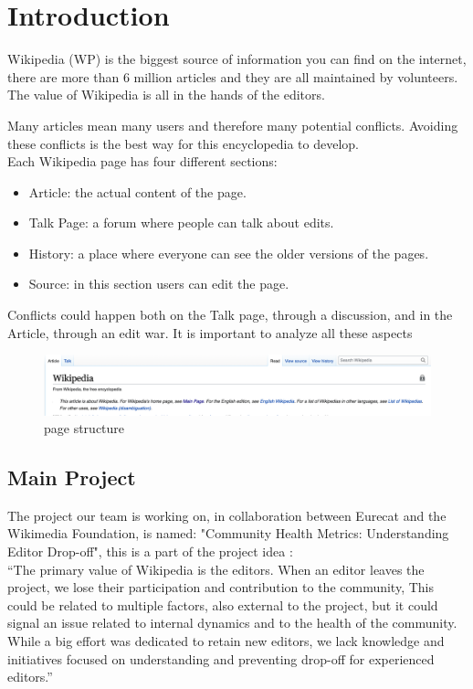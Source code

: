 \chapter{Introduction}
Wikipedia (WP) is the biggest source of information you can find on the internet, there are more
than 6 million articles and they are all maintained by volunteers. The value of Wikipedia is all in
the hands of the editors.

Many articles mean many users and therefore many potential conflicts. Avoiding these conflicts is
the best way for this encyclopedia to develop. \\ 
Each Wikipedia page has four different sections:  
\begin{itemize}
    \item Article: the actual content of the page.
    \item Talk Page: a forum where people can talk about edits. 
    \item History: a place where everyone can see the older versions of the pages.
    \item Source: in this section users can edit the page. 
\end{itemize}

Conflicts could happen both on the Talk page, through a discussion, and in the Article, through an
edit war. It is important to analyze all these aspects 

\begin{figure}
    \centering
    \includegraphics[width=1\textwidth]{./chapters/01/assets/wikipedia_page.png}
    \caption{page structure}
    \label{fig:page}
\end{figure}

\section{Main Project}
\label{sec:Main Project}
The project our team is working on, in collaboration between Eurecat and the Wikimedia Foundation,
is named: "Community Health Metrics: Understanding Editor Drop-off", this is a part of the
project idea : \\

“The primary value of Wikipedia is the editors. When an editor leaves the project, we lose their
participation and contribution to the community, This could be related to multiple factors, also
external to the project, but it could signal an issue related to internal dynamics and to the health
of the community. While a big effort was dedicated to retain new editors, we lack knowledge and
initiatives focused on understanding and preventing drop-off for experienced editors.”
\\

